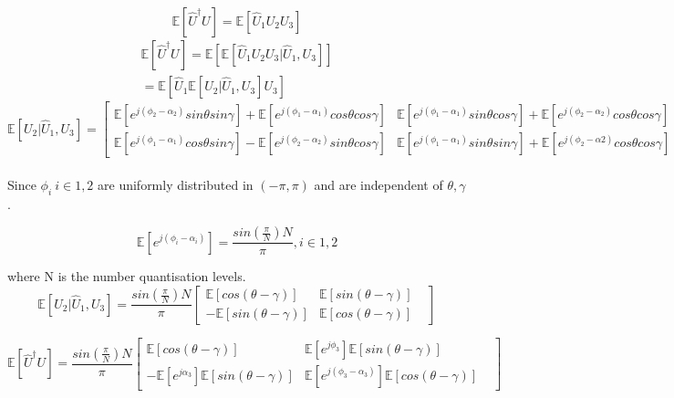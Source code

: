 \documentclass[conference]{IEEEtran}
\begin{document}
\begin{equation*}\label{eq:20}
	\mathbb{E}[\hat U^\dagger U]= \mathbb{E}[\hat U_1 U_2 U_3]
\end{equation*}
\begin{equation*}\label{eq:21}
	\begin{split}
		\mathbb{E}[\hat U^\dagger U]= \mathbb{E}[\mathbb{E}[\hat U_1 U_2 U_3| \hat U_1, U_3] ]\\
									= \mathbb{E}[\hat U_1 \mathbb{E}[ U_2| \hat U_1, U_3]  U_3]
	\end{split}
\end{equation*}
\resizebox{ 1.2\linewidth}{!}
{
	$\mathbb{E}[U_2|\hat U_1,U_3]= \begin{bmatrix}
	\mathbb{E}[e^{j(\phi_2-\alpha_2)}sin\theta sin\gamma]+\mathbb{E}[e^{j(\phi_1-\alpha_1)}cos\theta cos\gamma] & \mathbb{E}[e^{j(\phi_1-\alpha_1)}sin\theta cos\gamma]+\mathbb{E}[e^{j(\phi_2-\alpha_2)}cos\theta cos\gamma ]&\\
	\mathbb{E}[e^{j(\phi_1-\alpha_1)}cos\theta sin\gamma]-\mathbb{E}[e^{j(\phi_2-\alpha_2)}sin\theta cos\gamma] &\mathbb{E}[e^{j(\phi_1-\alpha_1)}sin\theta sin\gamma]+\mathbb{E}[e^{j(\phi_2-\alpha2)}cos\theta cos\gamma] &
\end{bmatrix}	$
}\\
\\
Since $\phi_i \ i \in 1,2$  are uniformly distributed in $(-\pi,\pi)$ and are independent of $\theta, \gamma$.

\begin{equation*}\label{eq:21}
	\mathbb{E}[e^{j(\phi_i-\alpha_i)}] = \frac{sin(\frac{\pi}{N})N}{\pi}, i\in 1,2
\end{equation*}

where N is the number quantisation levels.
\begin{equation*}\label{eq:22}
	\mathbb{E}[U_2| \hat U_1, U_3 ] = \frac{sin(\frac{\pi}{N})N}{\pi}\begin{bmatrix}
	\mathbb{E}[cos(\theta - \gamma)] & \mathbb{E}[sin(\theta-\gamma)]&\\
	 -\mathbb{E}[sin(\theta -\gamma)] & \mathbb{E}[cos(\theta -\gamma)] &
\end{bmatrix}
\end{equation*}

\begin{equation*}\label{eq:23}	
	\mathbb{E}[\hat U^{\dagger}U] = 
	\frac{sin(\frac{\pi}{N})N}{\pi}\begin{bmatrix}
	\mathbb{E}[cos(\theta - \gamma)] & \mathbb{E}[e^{j\phi_3}] \mathbb{E}[sin(\theta-\gamma)]&\\
	 -\mathbb{E}[e^{j\alpha_3}] \mathbb{E}[sin(\theta -\gamma)] & \mathbb{E}[e^{j(\phi_3-\alpha_3)}] \mathbb{E}[cos(\theta -\gamma)] &
\end{bmatrix}
\end{equation*}
\end{document}
